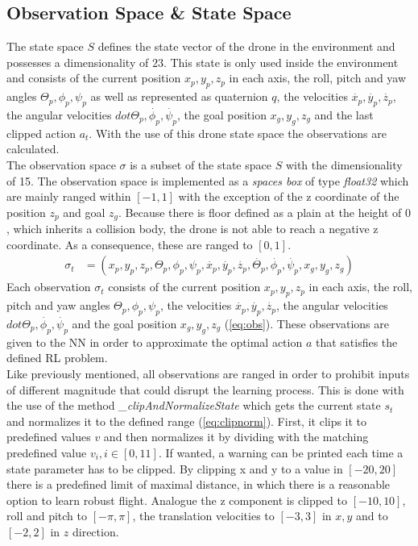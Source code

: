 \subsection{Observation Space \& State Space}
The state space $S$ defines the state vector of the drone in the environment and possesses a dimensionality of $23$. This state is only used inside the environment and consists of the current position $x_p, y_p, z_p$ in each axis, the roll, pitch and yaw angles $\Theta_p, \phi_p, \psi_p$ as well as represented as quaternion $q$, the velocities $\dot{x_p}, \dot{y_p}, \dot{z_p}$, the angular velocities $dot{\Theta_p}, \dot{\phi_p}, \dot{\psi_p}$, the goal position $x_g, y_g, z_g$ and the last clipped action $a_t$. With the use of this drone state space the observations are calculated.\\
\newline
The observation space $\sigma$ is a subset of the state space $S$ with the dimensionality of 15. The observation space is implemented as a \emph{spaces box} of type \emph{float32} which are mainly ranged within $[-1, 1]$ with the exception of the z coordinate of the position $z_p$ and goal $z_g$. Because there is floor defined as a plain at the height of $0$, which inherits a collision body, the drone is not able to reach a negative z coordinate. As a consequence, these are ranged to $[0,1]$.
\newline
\begin{align}
	\sigma_t &= (x_p,y_p,z_p, \Theta_p, \phi_p, \psi_p, \dot{x_p}, \dot{y_p}, \dot{z_p}, \dot{\Theta_p}, \dot{\phi_p}, \dot{\psi_p}, x_g, y_g, z_g) \label{eq:obs}
\end{align}
\newline
Each observation $\sigma_t$ consists of the current position $x_p, y_p, z_p$ in each axis, the roll, pitch and yaw angles $\Theta_p, \phi_p, \psi_p$, the velocities $\dot{x_p}, \dot{y_p}, \dot{z_p}$, the angular velocities $dot{\Theta_p}, \dot{\phi_p}, \dot{\psi_p}$ and the goal position $x_g, y_g, z_g$ (\cref{eq:obs}). These observations are given to the NN in order to approximate the optimal action $a$ that satisfies the defined RL problem.\\
\newline
Like previously mentioned, all observations are ranged in order to prohibit inputs of different magnitude that could disrupt the learning process. This is done with the use of the method \emph{\_clipAndNormalizeState} which gets the current state $s_t$ and normalizes it to the defined range (\cref{eq:clipnorm}). First, it clips it to predefined values $v$ and then normalizes it by dividing with the matching predefined value $v_i, i\in[0,11]$. If wanted, a warning can be printed each time a state parameter has to be clipped. By clipping x and y to a value in $[-20,20]$ there is a predefined limit of maximal distance, in which there is a reasonable option to learn robust flight. Analogue the z component is clipped to $[-10,10]$, roll and pitch to $[-\pi, \pi]$, the translation velocities to $[-3, 3]$ in $x, y$ and to $[-2,2]$ in $z$ direction. 
